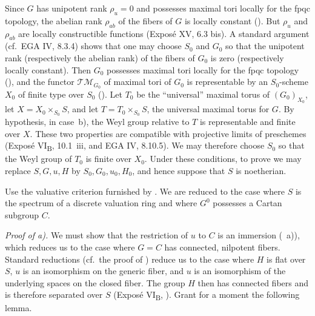 Since \(G\) has unipotent rank \(\rho_u=0\) and possesses maximal
tori locally for the fpqc topology, the abelian rank \(\rho_{ab}\) of
the fibers of \(G\) is locally constant (). But
\(\rho_u\) and \(\rho_{ab}\) are locally constructible functions
(Exposé XV, 6.3 bis). A standard argument (cf.\ EGA IV, 8.3.4) shows
that one may choose \(S_0\) and \(G_0\) so that the unipotent rank
(respectively the abelian rank) of the fibers of \(G_0\) is zero
(respectively locally constant). Then \(G_0\) possesses maximal tori
locally for the fpqc topology (), and the functor
\(\mathcal{TM}_{G_0}\) of maximal tori of \(G_0\) is representable by
an \(S_0\)-scheme \(X_0\) of finite type over \(S_0\) (). Let \(T_0\) be the ``universal'' maximal torus of
\((G_0)_{X_0}\), let \(X=X_0\times_{S_0}S\), and let
\(T=T_0\times_{S_0}S\), the universal maximal torus for \(G\). By
hypothesis, in case~b), the Weyl group relative to \(T\) is
representable and finite over \(X\). These two properties are
compatible with projective limits of preschemes (Exposé
VI\textsubscript{B}, 10.1~iii, and EGA IV, 8.10.5). We may therefore
choose \(S_0\) so that the Weyl group of \(T_0\) is finite over
\(X_0\). Under these conditions, to prove  we may replace
\(S,G,u,H\) by \(S_0,G_0,u_0,H_0\), and hence suppose that \(S\) is
noetherian.

Use the valuative criterion furnished by . We are reduced to the
case where \(S\) is the spectrum of a discrete valuation ring and
where \(G^0\) possesses a Cartan subgroup \(C\).

\smallskip
\noindent\textit{Proof of  a).}
We must show that the restriction of \(u\) to \(C\) is an immersion
(~a)), which reduces us to the case where \(G=C\) has connected,
nilpotent fibers. Standard reductions (cf.\ the proof of ) reduce us to the case where \(H\) is flat over \(S\), \(u\) is
an isomorphism on the generic fiber, and \(u\) is an isomorphism of
the underlying spaces on the closed fiber. The group \(H\) then has
connected fibers and is therefore separated over \(S\) (Exposé
VI\textsubscript{B}, ). Grant for a moment the following lemma.

